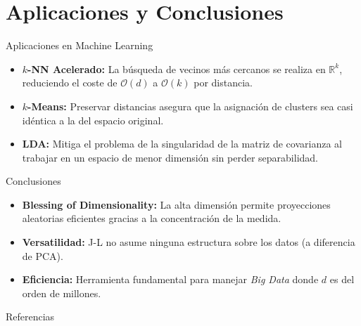 \documentclass[
    12pt,
    aspectratio=1610,
    c,
    spanish,
    intlimits,
    handout,
    leqno,
    professionalfonts,
]{beamer}
\begin{document}
\section{Aplicaciones y Conclusiones}

\begin{frame}{Aplicaciones en Machine Learning}
	\begin{itemize}
		\item \textbf{$k$-NN Acelerado:} La búsqueda de vecinos más cercanos se realiza en $\mathbb{R}^k$, reduciendo el coste de $\mathcal{O}(d)$ a $\mathcal{O}(k)$ por distancia.
		\item \textbf{$k$-Means:} Preservar distancias asegura que la asignación de clusters sea casi idéntica a la del espacio original.
		\item \textbf{LDA:} Mitiga el problema de la singularidad de la matriz de covarianza al trabajar en un espacio de menor dimensión sin perder separabilidad.
	\end{itemize}
\end{frame}

\begin{frame}{Conclusiones}
	\begin{itemize}
		\item \textbf{Blessing of Dimensionality:} La alta dimensión permite proyecciones aleatorias eficientes gracias a la concentración de la medida.
		\item \textbf{Versatilidad:} J-L no asume ninguna estructura sobre los datos (a diferencia de PCA).
		\item \textbf{Eficiencia:} Herramienta fundamental para manejar \textit{Big Data} donde $d$ es del orden de millones.
	\end{itemize}
\end{frame}

\begin{frame}[allowframebreaks]{Referencias}
	\printbibliography[heading=none]
\end{frame}
\end{document}
